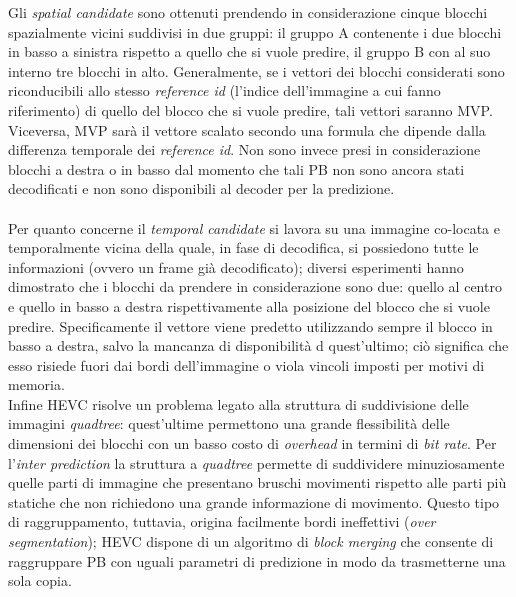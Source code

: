 Gli \emph{spatial candidate} sono ottenuti prendendo in considerazione cinque 
blocchi spazialmente vicini suddivisi in due gruppi: il gruppo A contenente i 
due blocchi in basso a sinistra rispetto a quello che si vuole predire, il 
gruppo B con al suo interno tre blocchi in alto.
Generalmente, se i vettori dei blocchi considerati sono riconducibili allo 
stesso \emph{reference id} (l'indice dell'immagine a cui fanno 
riferimento) di quello del blocco che si vuole predire, tali vettori saranno 
MVP.
Viceversa, MVP sarà il vettore scalato secondo una formula che dipende dalla 
differenza temporale dei \emph{reference id}.
Non sono invece presi in considerazione blocchi a destra o in basso dal 
momento che tali PB non sono ancora stati decodificati e non sono disponibili 
al decoder per la predizione.
\\ \\
Per quanto concerne il \emph{temporal candidate} si lavora su una immagine 
co-locata e temporalmente vicina della quale, in fase di decodifica, si 
possiedono tutte le informazioni (ovvero un frame già decodificato); diversi 
esperimenti hanno dimostrato che i blocchi da prendere in considerazione sono 
due: quello al centro e quello in basso a destra rispettivamente alla posizione 
del blocco che si vuole predire.
Specificamente il vettore viene predetto utilizzando sempre il blocco in basso 
a destra, salvo la mancanza di disponibilità d quest'ultimo; ciò significa che 
esso risiede fuori dai bordi dell'immagine o viola vincoli imposti per motivi 
di memoria.
\newline \\
Infine HEVC risolve un problema legato alla struttura di suddivisione delle 
immagini \emph{quadtree}: quest'ultime permettono una grande flessibilità 
delle dimensioni dei blocchi con un basso costo di \emph{overhead} in termini 
di \emph{bit rate}. Per l'\emph{inter prediction} la struttura a \emph{quadtree}
 permette di suddividere minuziosamente quelle parti di immagine che presentano 
bruschi movimenti rispetto alle parti più statiche che non richiedono una 
grande informazione di movimento. Questo tipo di raggruppamento, tuttavia, 
origina facilmente bordi ineffettivi (\emph{over segmentation}); HEVC dispone 
di un  algoritmo di \emph{block merging} che consente di raggruppare PB con 
uguali parametri di predizione in modo da trasmetterne una sola copia.

